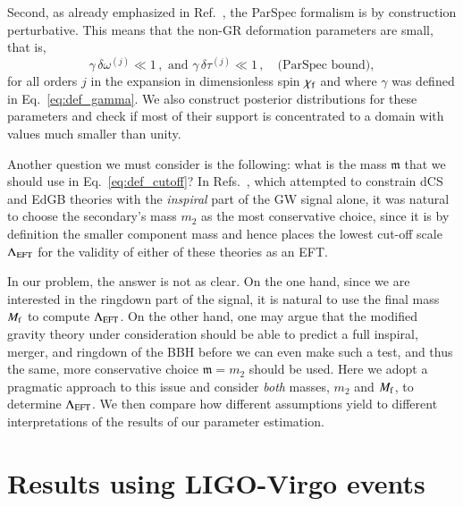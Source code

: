 \documentclass[twocolumn,
               prd,
               aps,
               superscriptaddress,
               tightenlines,
               nofootinbib,
               eqsecnum,
               amsfonts,
               amsmath,
               longbibliography]{revtex4-1}
\newcommand{\gm}{\mathfrak{m}}
\newcommand{\hs}[1]{{\textcolor{blue}{{[HS: #1]}} }}
\begin{document}
Second, as already emphasized in Ref.~\cite{Maselli:2019mjd}, the ParSpec
formalism is by construction perturbative. This means that the non-GR
deformation parameters are small, that is,
%
\begin{equation}
\gamma \, \delta \omega^{(j)} \ll 1 \,,
\,\, \textrm{and} \,\,
\gamma \, \delta \tau^{(j)} \ll 1 \,, \quad \textrm{(ParSpec bound)},
\label{eq:parspec_bound}
\end{equation}
%
for all orders $j$ in the expansion in dimensionless spin $\chi_{\rm f}$ and where $\gamma$
was defined in Eq.~\eqref{eq:def_gamma}.
%
We also construct posterior distributions for these parameters and check if
most of their support is concentrated to a domain with values much smaller than
unity.

Another question we must consider is the following: what is the mass $\mathfrak{m}$ that we should use
in Eq.~\eqref{eq:def_cutoff}?
%
In Refs.~\cite{Nair:2019iur,Perkins:2021mhb,Lyu:2022gdr}, which attempted to
constrain dCS and EdGB theories with the \emph{inspiral} part of
the GW signal alone, it was natural to choose the secondary's mass $m_2$ as the most
conservative choice, since it is by definition the smaller component mass and hence
places the lowest cut-off scale $\Lambda_{\rm EFT}$ for the validity of either of these theories as an EFT.

In our problem, the answer is not as clear. On the one hand, since we are
interested in the ringdown part of the signal, it is natural to use the
final mass $M_{\rm f}$ to compute $\Lambda_{\rm EFT}$.
%
On the other hand, one may argue that the modified gravity theory under
consideration should be able to predict a full inspiral, merger, and ringdown
of the BBH before we can even make such a test, and thus the
same, more conservative choice $\gm = m_2$ should be used.
%
Here we adopt a pragmatic approach to this issue and consider \emph{both}
masses, $m_2$ and $M_{\rm f}$, to determine $\Lambda_{\rm EFT}$.
%
We then compare how different assumptions yield to different
interpretations of the results of our parameter estimation.



\section{Results using LIGO-Virgo events}
\label{sec:results}

\end{document}
